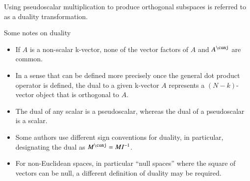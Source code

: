 
Using pseudoscalar multiplication to produce orthogonal subspaces
is referred to as a duality transformation.


Some notes on duality

\begin{itemize}
\item If \( A \) is a non-scalar k-vector, none of the vector factors of \( A \) and \( A^\conj \) are common.
\item In a sense that can be defined more precisely once the general dot product operator is defined, the dual to a given k-vector \( A \) represents a \((N-k)\)-vector object that is orthogonal to \( A \).
\item The dual of any scalar is a pseudoscalar, whereas the dual of a pseudoscalar is a scalar.
\item Some authors use different sign conventions for duality, in particular, designating the dual as \( M^\conj = M I^{-1} \).
\item For non-Euclidean spaces, in particular ``null spaces'' where the square of vectors can be null, a different definition of duality may be required.
\end{itemize}




